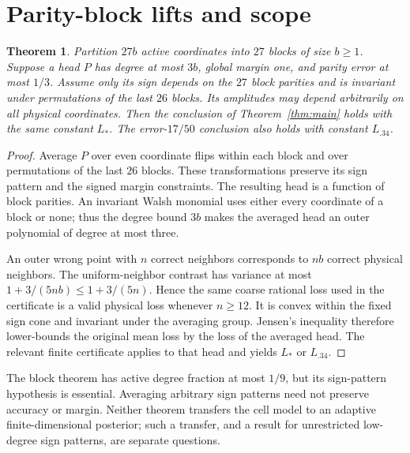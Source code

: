 \documentclass[11pt]{article}
\newtheorem{theorem}{Theorem}
\begin{document}
\section{Parity-block lifts and scope}
\begin{theorem}\label{thm:lift}
Partition $27b$ active coordinates into $27$ blocks of size $b\ge1$. Suppose a head $P$ has degree at most $3b$, global margin one, and parity error at most $1/3$. Assume only its \emph{sign} depends on the $27$ block parities and is invariant under permutations of the last $26$ blocks. Its amplitudes may depend arbitrarily on all physical coordinates. Then the conclusion of Theorem~\ref{thm:main} holds with the same constant $L_*$. The error-$17/50$ conclusion also holds with constant $L_{.34}$.
\end{theorem}
\begin{proof}
Average $P$ over even coordinate flips within each block and over permutations of the last $26$ blocks. These transformations preserve its sign pattern and the signed margin constraints. The resulting head is a function of block parities. An invariant Walsh monomial uses either every coordinate of a block or none; thus the degree bound $3b$ makes the averaged head an outer polynomial of degree at most three.

An outer wrong point with $n$ correct neighbors corresponds to $nb$ correct physical neighbors. The uniform-neighbor contrast has variance at most $1+3/(5nb)\le1+3/(5n)$. Hence the same coarse rational loss used in the certificate is a valid physical loss whenever $n\ge12$. It is convex within the fixed sign cone and invariant under the averaging group. Jensen's inequality therefore lower-bounds the original mean loss by the loss of the averaged head. The relevant finite certificate applies to that head and yields $L_*$ or $L_{.34}$.
\end{proof}

The block theorem has active degree fraction at most $1/9$, but its sign-pattern hypothesis is essential. Averaging arbitrary sign patterns need not preserve accuracy or margin. Neither theorem transfers the cell model to an adaptive finite-dimensional posterior; such a transfer, and a result for unrestricted low-degree sign patterns, are separate questions.
\end{document}
